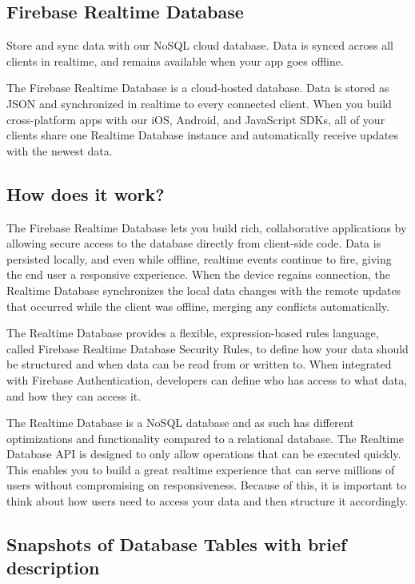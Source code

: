\subsection{Firebase Realtime Database}
Store and sync data with our NoSQL cloud database. Data is synced across all clients in realtime, and remains available when your app goes offline.

The Firebase Realtime Database is a cloud-hosted database. Data is stored as JSON and synchronized in realtime to every connected client. When you build cross-platform apps with our iOS, Android, and JavaScript SDKs, all of your clients share one Realtime Database instance and automatically receive updates with the newest data.
\subsection{How does it work?}
The Firebase Realtime Database lets you build rich, collaborative applications by allowing secure access to the database directly from client-side code. Data is persisted locally, and even while offline, realtime events continue to fire, giving the end user a responsive experience. When the device regains connection, the Realtime Database synchronizes the local data changes with the remote updates that occurred while the client was offline, merging any conflicts automatically.

The Realtime Database provides a flexible, expression-based rules language, called Firebase Realtime Database Security Rules, to define how your data should be structured and when data can be read from or written to. When integrated with Firebase Authentication, developers can define who has access to what data, and how they can access it.

The Realtime Database is a NoSQL database and as such has different optimizations and functionality compared to a relational database. The Realtime Database API is designed to only allow operations that can be executed quickly. This enables you to build a great realtime experience that can serve millions of users without compromising on responsiveness. Because of this, it is important to think about how users need to access your data and then structure it accordingly.



\subsection{Snapshots of Database Tables with brief description}